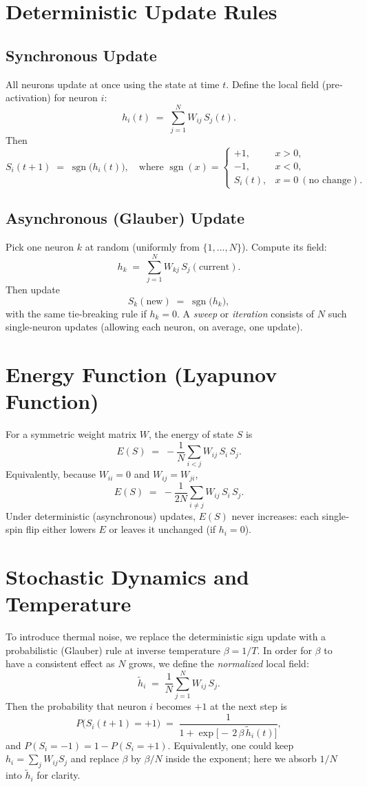 \documentclass{article}
\begin{document}
\section{Deterministic Update Rules}

\subsection{Synchronous Update}
All neurons update at once using the state at time $t$.  Define the local field (pre‐activation) for neuron $i$:
\[
h_i(t)
\;=\;
\sum_{j=1}^{N} W_{ij}\,S_j(t).
\]
Then
\[
S_i(t+1)
\;=\;
\operatorname{sgn}\bigl(h_i(t)\bigr),\quad
\text{where }
\operatorname{sgn}(x)
=
\begin{cases}
+1, & x > 0,\\
-1, & x < 0,\\
S_i(t), & x = 0\ (\text{no change}).
\end{cases}
\]

\subsection{Asynchronous (Glauber) Update}
Pick one neuron $k$ at random (uniformly from $\{1,\dots,N\}$).  Compute its field:
\[
h_k \;=\; \sum_{j=1}^{N} W_{kj}\,S_j(\text{current}).
\]
Then update
\[
S_k(\text{new})
\;=\;
\operatorname{sgn}\bigl(h_k\bigr),
\]
with the same tie‐breaking rule if $h_k = 0$.  A \emph{sweep} or \emph{iteration} consists of $N$ such single‐neuron updates (allowing each neuron, on average, one update).

\section{Energy Function (Lyapunov Function)}
For a symmetric weight matrix $W$, the energy of state $S$ is
\[
E(S)
\;=\;
-\frac{1}{N}\sum_{i<j} W_{ij}\,S_i\,S_j.
\]
Equivalently, because $W_{ii}=0$ and $W_{ij}=W_{ji}$,
\[
E(S)
\;=\;
-\frac{1}{2N}\sum_{i\neq j} W_{ij}\,S_i\,S_j.
\]
Under deterministic (asynchronous) updates, $E(S)$ never increases:
each single‐spin flip either lowers $E$ or leaves it unchanged (if $h_i=0$).

\section{Stochastic Dynamics and Temperature}
To introduce thermal noise, we replace the deterministic sign update with a probabilistic (Glauber) rule at inverse temperature $\beta = 1/T$.  In order for $\beta$ to have a consistent effect as $N$ grows, we define the \emph{normalized} local field:
\[
\tilde{h}_i
\;=\;
\frac{1}{N}\sum_{j=1}^{N} W_{ij}\,S_j.
\]
Then the probability that neuron $i$ becomes $+1$ at the next step is
\[
P\bigl(S_i(t+1)=+1\bigr)
\;=\;
\frac{1}{1 + \exp\bigl[-\,2\,\beta\,\tilde{h}_i(t)\bigr]},
\]
and $P(S_i=-1)=1-P(S_i=+1)$.  Equivalently, one could keep 
$h_i=\sum_j W_{ij}S_j$ and replace $\beta$ by $\beta/N$ inside the exponent; here we absorb $1/N$ into $\tilde{h}_i$ for clarity.
\end{document}
